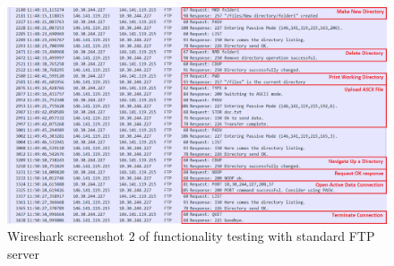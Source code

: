 \documentclass[10pt,twocolumn]{witseiepaper}
\begin{document}
\begin{appendix}
\begin{figure}[h]
\centering
\includegraphics[width=0.9\columnwidth]{WitsServerCapture2.png}
\caption{Wireshark screenshot 2 of functionality testing with standard FTP server}
\raggedright
\label{fig:WitsWS2}
\end{figure}



\end{appendix}

\end{document}
